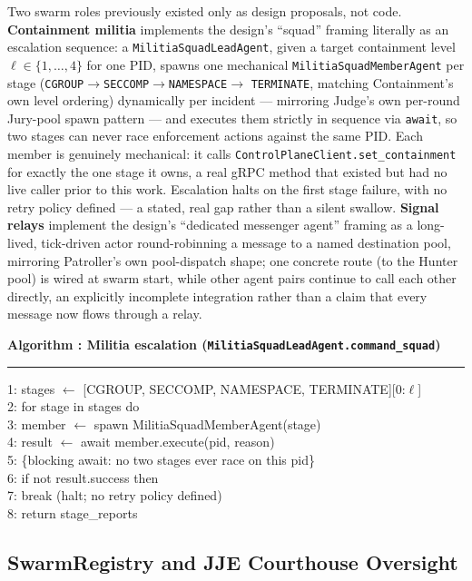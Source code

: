 \documentclass{article}
\newcounter{algo}
\newenvironment{algobox}[1]{%
  \begin{framed}\refstepcounter{algo}\textbf{\sffamily\small Algorithm \thealgo: #1}\vspace{3pt}\hrule\vspace{5pt}
  \small\ttfamily\raggedright
}{%
  \end{framed}
}
\begin{document}
Two swarm roles previously existed only as design proposals, not code.
\textbf{Containment militia} implements the design's ``squad''
framing literally as an escalation sequence: a
\texttt{MilitiaSquadLeadAgent}, given a target containment level
$\ell \in \{1,\dots,4\}$ for one PID, spawns one mechanical
\texttt{MilitiaSquadMemberAgent} per stage
(\texttt{CGROUP}$\to$\texttt{SECCOMP}$\to$\texttt{NAMESPACE}$\to$
\texttt{TERMINATE}, matching Containment's own level ordering)
dynamically per incident --- mirroring Judge's own per-round Jury-pool
spawn pattern --- and executes them strictly in sequence via
\texttt{await}, so two stages can never race enforcement actions
against the same PID. Each member is genuinely mechanical: it calls
\texttt{ControlPlaneClient.set\_containment} for exactly the one stage
it owns, a real gRPC method that existed but had no live caller prior
to this work. Escalation halts on the first stage failure, with no
retry policy defined --- a stated, real gap rather than a silent
swallow. \textbf{Signal relays} implement the design's ``dedicated
messenger agent'' framing as a long-lived, tick-driven actor
round-robinning a message to a named destination pool, mirroring
Patroller's own pool-dispatch shape; one concrete route (to the Hunter
pool) is wired at swarm start, while other agent pairs continue to
call each other directly, an explicitly incomplete integration rather
than a claim that every message now flows through a relay.

\begin{algobox}{Militia escalation (\texttt{MilitiaSquadLeadAgent.command\_squad})}
\label{alg:militia}
1: stages $\gets$ [CGROUP, SECCOMP, NAMESPACE, TERMINATE][0{:}$\ell$]\\
2: for stage in stages do\\
3: \quad member $\gets$ spawn MilitiaSquadMemberAgent(stage)\\
4: \quad result $\gets$ await member.execute(pid, reason)\\
5: \quad \{blocking await: no two stages ever race on this pid\}\\
6: \quad if not result.success then\\
7: \qquad break \quad(halt; no retry policy defined)\\
8: return stage\_reports
\end{algobox}

\subsection{SwarmRegistry and JJE Courthouse Oversight}
\label{sec:courthouse}
\end{document}
